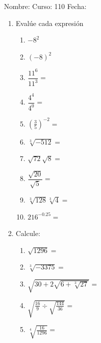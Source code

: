 \documentclass[fleqn]{article}
\newcommand{\LineaNombre}{%
\par
\vspace{\baselineskip}
Nombre:\hrulefill \; Curso: 110\underline{\hspace*{12pt}} \; Fecha: \underline{\hspace*{2.5cm}} \relax
\par}
\begin{document}
\LineaNombre
\begin{enumerate}
   \item Evalúe cada expresión
   \begin{enumerate}
   \item $-8^{2}$\noanswer
   \item $(-8)^{2}$\noanswer
   \item $\dfrac{11^{6}}{11^{3}}=$ \noanswer
   \item $\dfrac{4^{4}}{4^{0}}=$ \noanswer
   \item $(\frac{3}{5})^{-2}=$ \noanswer
   \item $\sqrt[3]{-512}=$\noanswer
   \item $\sqrt{72}\sqrt{8}=$\noanswer
   \item $\dfrac{\sqrt{20}}{\sqrt{5}}=$\noanswer
   \item $\sqrt[3]{128}\sqrt[3]{4}=$\noanswer
   \item $216^{-0.25}=$\noanswer
   \end{enumerate}
   \newpage
   \item Calcule:
   \begin{enumerate}
   \item $\sqrt{1296}=$\noanswer
   \item $\sqrt[3]{-3375}=$\noanswer
   \item $\sqrt{30+2\sqrt{6+\sqrt[3]{27}}}=$\noanswer
   \item $\sqrt{\frac{16}{9}\div\sqrt{\frac{144}{36}}}=$\noanswer
   \item $\sqrt[4]{\frac{16}{1296}}=$\noanswer
   \end{enumerate}
   \end{enumerate}
\end{document}
